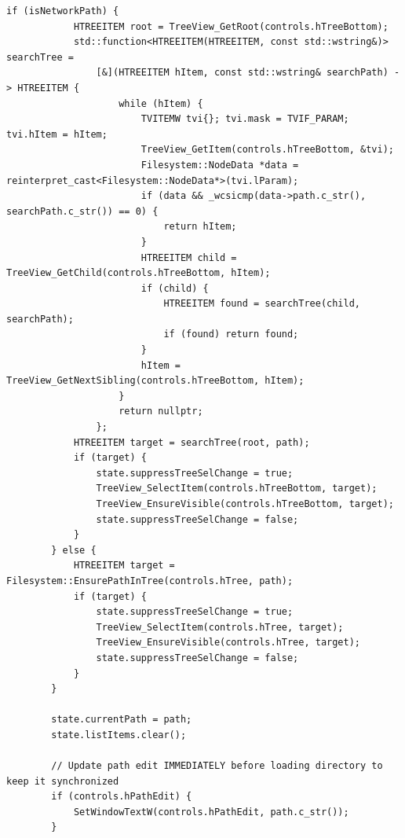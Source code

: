 \begin{lstlisting}[style=CodeListing]
        if (isNetworkPath) {
            HTREEITEM root = TreeView_GetRoot(controls.hTreeBottom);
            std::function<HTREEITEM(HTREEITEM, const std::wstring&)> searchTree = 
                [&](HTREEITEM hItem, const std::wstring& searchPath) -> HTREEITEM {
                    while (hItem) {
                        TVITEMW tvi{}; tvi.mask = TVIF_PARAM; tvi.hItem = hItem;
                        TreeView_GetItem(controls.hTreeBottom, &tvi);
                        Filesystem::NodeData *data = reinterpret_cast<Filesystem::NodeData*>(tvi.lParam);
                        if (data && _wcsicmp(data->path.c_str(), searchPath.c_str()) == 0) {
                            return hItem;
                        }
                        HTREEITEM child = TreeView_GetChild(controls.hTreeBottom, hItem);
                        if (child) {
                            HTREEITEM found = searchTree(child, searchPath);
                            if (found) return found;
                        }
                        hItem = TreeView_GetNextSibling(controls.hTreeBottom, hItem);
                    }
                    return nullptr;
                };
            HTREEITEM target = searchTree(root, path);
            if (target) {
                state.suppressTreeSelChange = true;
                TreeView_SelectItem(controls.hTreeBottom, target);
                TreeView_EnsureVisible(controls.hTreeBottom, target);
                state.suppressTreeSelChange = false;
            }
        } else {
            HTREEITEM target = Filesystem::EnsurePathInTree(controls.hTree, path);
            if (target) {
                state.suppressTreeSelChange = true;
                TreeView_SelectItem(controls.hTree, target);
                TreeView_EnsureVisible(controls.hTree, target);
                state.suppressTreeSelChange = false;
            }
        }
        
        state.currentPath = path;
        state.listItems.clear();
        
        // Update path edit IMMEDIATELY before loading directory to keep it synchronized
        if (controls.hPathEdit) {
            SetWindowTextW(controls.hPathEdit, path.c_str());
        }
        

\end{lstlisting}
